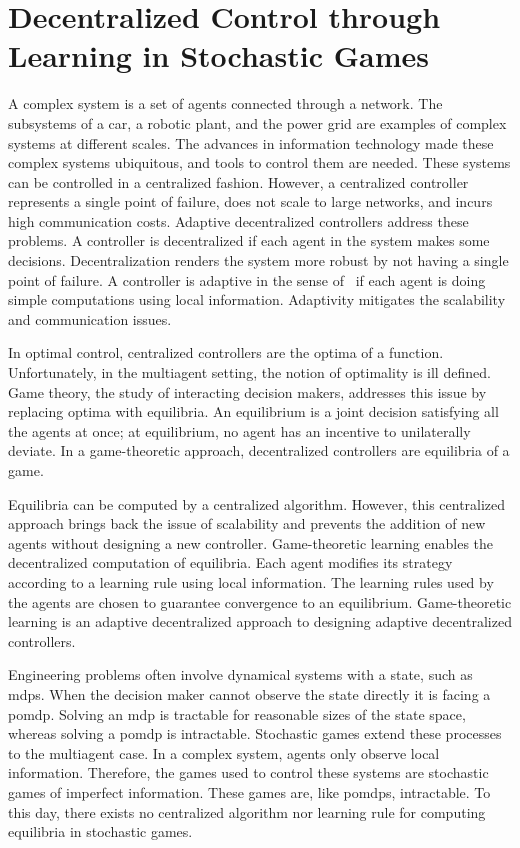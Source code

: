 \section{Decentralized Control through Learning in Stochastic Games}

A complex system is a set of agents connected through a network.
The subsystems of a car, a robotic plant, and the power grid are examples of complex systems at different scales.
The advances in information technology made these complex systems ubiquitous, and tools to control them are needed.
These systems can be controlled in a centralized fashion.
However, a centralized controller represents a single point of failure, does not scale to large networks, and incurs high communication costs.
Adaptive decentralized controllers address these problems.
A controller is decentralized if each agent in the system makes some decisions.
Decentralization renders the system more robust by not having a single point of failure.
A controller is adaptive in the sense of~\cite{hart_mas-colell:2000:general,hart_mas-colell:2000:simple} if each agent is doing simple computations using local information.
Adaptivity mitigates the scalability and communication issues.

In optimal control, centralized controllers are the optima of a function.
Unfortunately, in the multiagent setting, the notion of optimality is ill defined.
Game theory, the study of interacting decision makers, addresses this issue by replacing optima with equilibria.
An equilibrium is a joint decision satisfying all the agents at once; at equilibrium, no agent has an incentive to unilaterally deviate.
In a game-theoretic approach, decentralized controllers are equilibria of a game.

Equilibria can be computed by a centralized algorithm.
However, this centralized approach brings back the issue of scalability and prevents the addition of new agents without designing a new controller.
Game-theoretic learning enables the decentralized computation of equilibria.
Each agent modifies its strategy according to a learning rule using local information.
The learning rules used by the agents are chosen to guarantee convergence to an equilibrium.
Game-theoretic learning is an adaptive decentralized approach to designing adaptive decentralized controllers.

Engineering problems often involve dynamical systems with a state, such as \acp{mdp}.
When the decision maker cannot observe the state directly it is facing a \ac{pomdp}.
Solving an \ac{mdp} is tractable for reasonable sizes of the state space, whereas solving a \ac{pomdp} is intractable.
Stochastic games extend these processes to the multiagent case.
In a complex system, agents only observe local information.
Therefore, the games used to control these systems are stochastic games of imperfect information.
These games are, like \acp{pomdp}, intractable.
To this day, there exists no centralized algorithm nor learning rule for computing equilibria in stochastic games.

